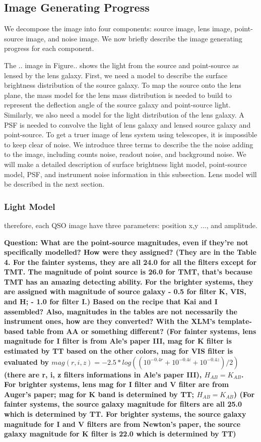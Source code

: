 \documentclass[a4paper,11pt]{article}
\begin{document}
\subsection{Image Generating Progress}
We decompose the image into four components: source image, lens image, point-source image, and noise image. We now briefly describe the image generating progress for each component. 

The .. image in Figure.. shows the light from the source and point-source as lensed by the lens galaxy. First, we need a model to describe the surface brightness distribution of the source galaxy. To map the source onto the lens plane, the mass model for the lens mass distribution is needed to build to represent the deflection angle of the source galaxy and point-source light. Similarly, we also need a model for the light distribution of the lens galaxy. A PSF is needed to convolve the light of lens galaxy and lensed source galaxy and point-source. To get a truer image of lens system using telescopes, it is impossible to keep clear of noise. We introduce three terms to describe the the noise adding to the image, including counts noise, readout noise, and background noise. We will make a detailed description of surface brightness light model, point-source model, PSF, and instrument noise information in this subsection. Lens model will be described in the next section.

\subsubsection{Light Model}


therefore, each QSO image have three parameters: position x,y ..., and amplitude. 
 
\textbf{{Question}: What are the point-source magnitudes, even if they're not specifically modelled? How were they assigned? (They are in the Table 4. For the fainter systems, they are all 24.0 for all the filters except for TMT. The magnitude of point source is 26.0 for TMT, that's because TMT has an amazing detecting ability. For the brighter systems, they are assigned with magnitude of source galaxy - 0.5 for filter K, VIS, and H; - 1.0 for filter I.)
 Based on the recipe that Kai and I assembled? Also, magnitudes in the tables are not necessarily the instrument ones, how are they converted? With the XLM's template-based table from AA or something different? (For fainter systems, lens magnitude for I filter is from Ale's paper III, mag for K filter is estimated by TT based on the other colors, mag for VIS filter is evaluated by $mag(r,i,z)=-2.5*log((10^{-0.4r}+10^{-0.4i}+10^{-0.4z})/2)$ (there are r, i, z filters informations in Ale's paper III), $H_{AB}=K_{AB}$. For brighter systems, lens mag for I filter and V filter are from Auger's paper; mag for K band is determined by TT;  $H_{AB}=K_{AB}$) (For fainter systems, the source galaxy magnitude for filters are all 25.0 which is determined by TT. For brighter systems, the source galaxy magnitude for I and V filters are from Newton's paper, the source galaxy magnitude for K filter is 22.0 which is determined by TT)}
\end{document}
